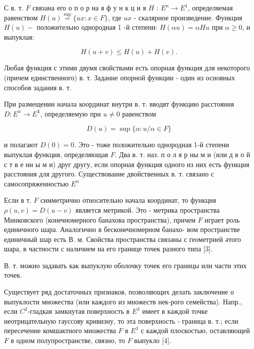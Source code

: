 \documentclass[10pt]{article}
\begin{document}
С в. т. $F$ связана его о п о р на я ф у н к ц и я $H$ : $E^{n} \rightarrow E^{1}$, определяемая равенством $H(u) \stackrel{\sup }{=}\{u x: x \in F\}$, где $u x$ - скалярное произведение. Функция $H(u)-$ положительно однородная 1 -й степени: $H(\alpha u)=\alpha H u$ при $\alpha \geqslant 0$, и выпуклая:



\[

H(u+v) \leqslant H(u)+H(v) .

\]



Любая функция с этими двумя свойствами есть опорная функция для некоторого (причем единственного) в. т. Задание опорной функции - один из основных способов задания в. т.



При размещении начала координат внутри в. т. вводят функцию расстояния $D: E^{n} \rightarrow E^{\mathbf{1}}$, определяемую при $u \neq 0$ равенством



\[

D(u)=\sup \{\alpha: u / \alpha \in F\}

\]



и полагают $D(0)=0$. Это - тоже положительно однородная 1-й степени выпуклая функция, определяющая $F$. Два в. т. наз. п о л я р ны м и (или д в о й с т в е нн ы м и) друг другу, если опорная функция одного из них есть функция расстояния для другого. Существование двойственных в. т. связано с самосопряженностью $E^{n}$



Если в т. $F$ симметрично относительно начала координат, то функция $\rho(u, v)=D(u-v)$ является метрикой. Это - метрика пространства Минковского (конечномерного банахова пространства), причем $F$ играет роль единичного шара. Аналогично в бесконечномерном банахо- вом пространстве единичный шар есть В. м. Свойства пространства связаны с геометрией әтого шара, в частности с наличием на его границе точек разного типа [3].



В. т. можно задавать как выпуклую оболочку точек его границы или части этих точек.



Существует ряд достаточных признаков, позволяющих делать заключение о выпуклости множества (или каждого из множеств нек-рого семейства). Напр., если $C^{2}$-гладкая замкнутая поверхность в $E^{3}$ имеет в каждой точке неотрицательную гауссову кривизну, то эта поверхность - граница в. т.; если пересечение комшактного множества $F$ в $E^{3}$ с каждой плоскостью, оставляющей $F$ в одном полупространстве, связно, то $F$ выпукло [4].
\end{document}
